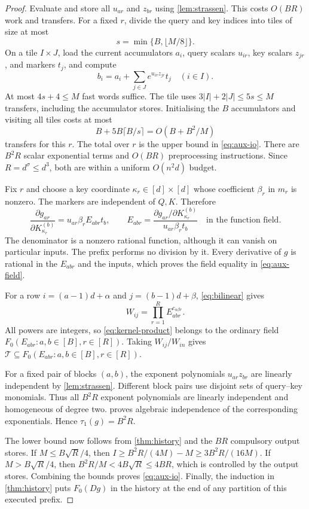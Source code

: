 \documentclass[11pt]{article}
\theoremstyle{definition}
\theoremstyle{remark}
\newcommand{\cT}{\mathcal T}
\begin{document}
\begin{proof}
Evaluate and store all $u_{ar}$ and $z_{br}$ using
\cref{lem:strassen}. This costs $O(BR)$ work and transfers.
For a fixed $r$, divide the query and key indices into tiles of size
at most
\[
 s=\min\{B,\lfloor M/8\rfloor\}.
\]
On a tile $I\times J$, load the current accumulators $a_i$, query
scalars $u_{ir}$, key scalars $z_{jr}$, and markers $t_j$, and compute
\begin{equation}
 b_i=a_i+\sum_{j\in J}e^{u_{ir}z_{jr}}t_j\quad(i\in I).
 \label{eq:tile}
\end{equation}
At most $4s+4\le M$ fast words suffice. The tile uses
$3|I|+2|J|\le5s\le M$ transfers, including the accumulator stores.
Initialising the $B$ accumulators and visiting all tiles costs at most
\[
 B+5B\lceil B/s\rceil=O(B+B^2/M)
\]
transfers for this $r$. The total over $r$ is the upper bound in
\cref{eq:aux-io}. There are $B^2R$ scalar exponential terms and
$O(BR)$ preprocessing instructions. Since $R=d^\sigma\le d^3$,
both are within a uniform $O(n^2d)$ budget.

Fix $r$ and choose a key coordinate $\kappa_r\in[d]\times[d]$ whose
coefficient $\beta_r$ in $m_r$ is nonzero. The markers are independent
of $Q,K$. Therefore
\begin{equation}
 \frac{\partial g_{ar}}{\partial K^{(b)}_{\kappa_r}}
   =u_{ar}\beta_r E_{abr}t_b,
 \qquad
 E_{abr}=\frac{\partial g_{ar}/\partial K^{(b)}_{\kappa_r}}
                  {u_{ar}\beta_rt_b}
 \quad\text{in the function field}.
 \label{eq:extract-leaf}
\end{equation}
The denominator is a nonzero rational function, although it can
vanish on particular inputs. The prefix performs no division by it.
Every derivative of $g$ is rational in the $E_{abr}$ and the inputs,
which proves the field equality in \cref{eq:aux-field}.

For a row $i=(a-1)d+\alpha$ and $j=(b-1)d+\beta$,
\cref{eq:bilinear} gives
\begin{equation}
 W_{ij}=\prod_{r=1}^R E_{abr}^{c_{\alpha\beta r}}.
 \label{eq:kernel-product}
\end{equation}
All powers are integers, so \cref{eq:kernel-product} belongs to the
ordinary field $F_0(E_{abr}:a,b\in[B],r\in[R])$. Taking $W_{ij}/W_{in}$ gives $\cT\subseteq
F_0(E_{abr}:a,b\in[B],r\in[R])$.

For a fixed pair of blocks $(a,b)$, the exponent polynomials
$u_{ar}z_{br}$ are linearly independent by \cref{lem:strassen}.
Different block pairs use disjoint sets of query--key monomials.
Thus all $B^2R$ exponent polynomials are linearly independent and
homogeneous of degree two.  proves algebraic
independence of the corresponding exponentials. Hence
$\tau_1(g)=B^2R$.

The lower bound now follows from \cref{thm:history} and the $BR$
compulsory output stores. If $M\le B\sqrt R/4$, then
$I\ge B^2R/(4M)-M\ge3B^2R/(16M)$. If $M>B\sqrt R/4$, then
$B^2R/M<4B\sqrt R\le4BR$, which is controlled by the output stores.
Combining the bounds proves \cref{eq:aux-io}. Finally, the induction
in \cref{thm:history} puts $F_0(Dg)$ in the history at the end of any
partition of this executed prefix.
\end{proof}
\end{document}
